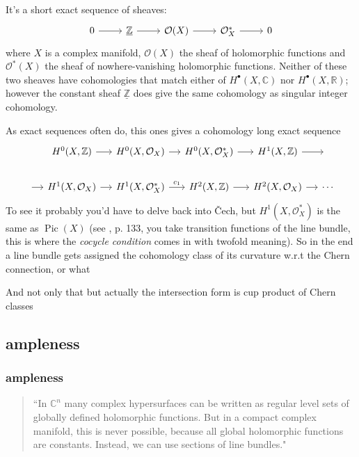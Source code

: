 It's a short exact sequence of sheaves:
\[\begin{tikzcd}0\arrow[r]&\underline{\mathbb{Z}}\arrow[r]&\mathcal{O}(X)\arrow[r]&\mathcal{O}^*_X\arrow[r]&0\end{tikzcd}\]
where \(X\) is a complex manifold, \(\mathcal{O}(X)\) the sheaf of holomorphic functions and \(\mathcal{O} ^*(X)\) the sheaf of nowhere-vanishing holomorphic functions. Neither of these two sheaves have cohomologies that match either of \(H^{\bullet}(X,\mathbb{C})\) nor \(H^{\bullet}(X,\mathbb{R})\); however the constant sheaf \(\underline{\mathbb{Z}}\) does give the same cohomology as singular integer cohomology.

As exact sequences often do, this ones gives a cohomology long exact sequence
\[\begin{tikzcd}[column sep=small]
	\leavevmode&H^{0}(X,\mathbb{Z})\arrow[r]&H^{0}(X,\mathcal{O}_X)\arrow[r]&H^{0}(X,\mathcal{O}_X^*)\arrow[r]&H^{1}(X,\mathbb{Z})\arrow[r]& \leavevmode\\
	\arrow[r]&H^{1}(X,\mathcal{O}_X)\arrow[r]&H^{1}(X,\mathcal{O}_X^*)\arrow[r,"c_1"]&H^{2}(X,\mathbb{Z})\arrow[r]&H^{2}(X,\mathcal{O}_X)\arrow[r]&\cdots
\end{tikzcd}\]
To see it probably you'd have to delve back into \v Cech, but \(H^{1}(X,\mathcal{O}_X^*)\) is the same as \(\operatorname{Pic}(X)\) (see \cite{gri}, p. 133, you take transition functions of the line bundle, this is where the \textit{cocycle condition} comes in with twofold meaning). So in the end a line bundle gets assigned the cohomology class of its curvature w.r.t the Chern connection, or what

And not only that but actually the intersection form is cup product of Chern classes



\subsection{ampleness}
\subsubsection{ampleness}

\begin{quotation}
	``In \(\mathbb{C}^n\) many complex hypersurfaces can be written as regular level sets of globally defined holomorphic functions. But in a compact complex manifold, this is never possible, because all global holomorphic functions are constants. Instead, we can use sections of line bundles."
\end{quotation}

